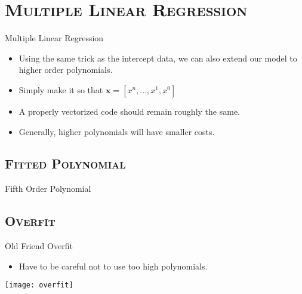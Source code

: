 \documentclass[xcolor=x11names,compress]{beamer}
\renewcommand{\(}{\begin{columns}}
\renewcommand{\)}{\end{columns}}
\newcommand{\<}[1]{\begin{column}{#1}}
\renewcommand{\>}{\end{column}}
\begin{document}
\section{\scshape Multiple Linear Regression}
\begin{frame}{Multiple Linear Regression}
	\begin{itemize}
		\item Using the same trick as the intercept data, we can also extend our model to higher order polynomials.
		\item Simply make it so that $\boldsymbol{x} = [x^n, ..., x^1, x^0]$
		\item A properly vectorized code should remain roughly the same.
		\item Generally, higher polynomials will have smaller costs.
	\end{itemize}
\end{frame}

\subsection{\scshape Fitted Polynomial}
\begin{frame}{Fifth Order Polynomial}
	\begin{center}
	\end{center}
\end{frame}

\subsection{\scshape Overfit}
\begin{frame}{Old Friend Overfit}
	\begin{itemize}
		\item Have to be careful not to use too high polynomials.
	\end{itemize}
	\begin{center}
		\texttt{[image: overfit]}
	\end{center}
\end{frame}

\end{document}
